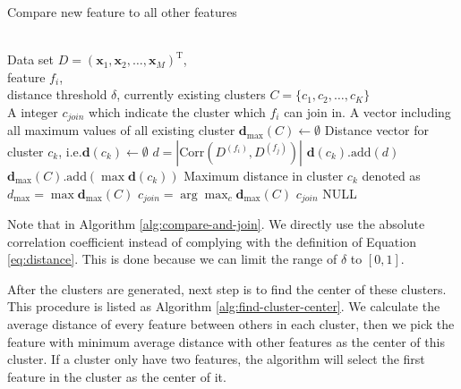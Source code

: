 \documentclass{ieeeaccess}
\theoremstyle{definition}
\begin{document}
\begin{algorithm}
\caption{Compare new feature to all other features}
\label{alg:compare-and-join}
\begin{algorithmic}[1]
\REQUIRE ~~\\
    Data set $D=(\bm{x}_1,\bm{x}_2,\ldots,\bm{x}_M)^\text{T}$, \\
    feature $f_i$, \\
    distance threshold $\delta$,
    currently existing clusters $C=\{c_1, c_2, \ldots, c_K\}$
\ENSURE ~~\\
    A integer $c_{join}$ which indicate the cluster which $f_i$ can join in.  
\STATE A vector including all maximum values of all existing cluster $\bm{d}_{\max}(C) \gets \emptyset$
    \STATE Distance vector for cluster $c_k$, i.e.$\bm{d}(c_k) \gets \emptyset$
        \STATE $d=|\text{Corr}(D^{(f_i)}, D^{(f_j)})|$
        \STATE $\bm{d}(c_k)\text{.add}(d)$
    \ENDFOR
    \STATE $\bm{d}_{\max}(C)\text{.add}(\max{\bm{d}(c_k)})$
\ENDFOR
\STATE Maximum distance in cluster $c_k$ denoted as $d_{\max}=\max{\bm{d}_{\max}(C)}$
    \STATE $c_{join}=\arg\max_c{\bm{d}_{\max}(C)}$
    \RETURN $c_{join}$
\ELSE
    \RETURN NULL
\ENDIF
\end{algorithmic}
\end{algorithm}

Note that in Algorithm \ref{alg:compare-and-join}. We directly use the absolute correlation coefficient instead of complying with the definition of Equation \ref{eq:distance}. This is done because we can limit the range of $\delta$ to $[0,1]$.

After the clusters are generated, next step is to find the center of these clusters. This procedure is listed as Algorithm \ref{alg:find-cluster-center}. We calculate the average distance of every feature between others in each cluster, then we pick the feature with minimum average distance with other features as the center of this cluster. If a cluster only have two features, the algorithm will select the first feature in the cluster as the center of it.
\end{document}
